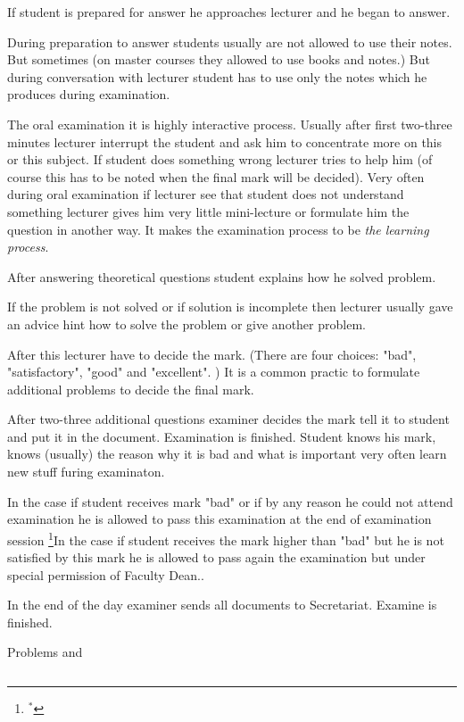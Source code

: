            If student is prepared for answer he approaches lecturer and he began to answer.

       During preparation to answer students usually are not allowed to use their notes. But sometimes
      (on master courses they allowed to use books and notes.) But during conversation with
       lecturer student has to use only the notes which he produces during examination.

     The oral examination it is highly interactive process.  Usually after first two-three minutes
      lecturer interrupt the student and ask him to concentrate more on this or this subject.
      If student does something wrong lecturer tries to help him (of course this has to be noted when the final mark
       will be decided). Very often during oral examination if lecturer see that student does not understand
         something lecturer gives him very little mini-lecture or formulate him the question in
         another way. It makes the examination process to be {\it the learning process}.

         After answering theoretical questions student explains how he solved problem.

         If the problem is not solved or if solution is incomplete then lecturer usually
          gave an advice hint how to solve the problem or give another problem.

          After this lecturer have to decide the mark. (There are four choices:
          "bad", "satisfactory", "good" and "excellent". ) It is a common practic to
          formulate additional problems to decide the final mark.

          After two-three additional questions examiner decides the mark tell it to student
          and put it in the document. Examination is finished. Student knows his mark,
          knows (usually) the reason why it is bad and what is important
           very often learn new stuff furing examinaton.

           In the case if student receives mark "bad" or if by any reason he could not attend
            examination he is allowed to pass this examination at the end of examination session
         \footnote{$^*$}{In the case if student receives the mark higher than "bad" but he is not satisfied by this mark
           he is allowed to pass again the examination but under special permission of Faculty Dean.}.


      In the end of the day examiner sends all documents to Secretariat. Examine is finished.



              {Problems and }




   $$ $$ $$ $$

\bye
